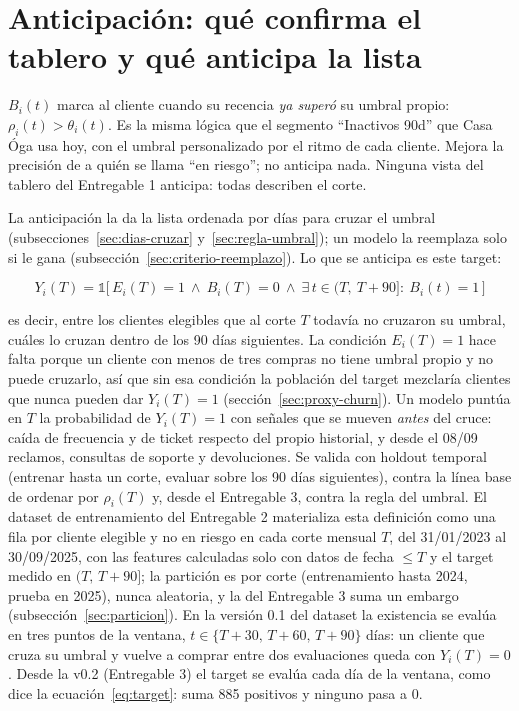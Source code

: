 \documentclass[11pt,a4paper]{article}
\begin{document}
\section{Anticipación: qué confirma el tablero y qué anticipa la lista}
\label{sec:anticipacion}

$B_i(t)$ marca al cliente cuando su recencia \emph{ya superó} su umbral propio: $\rho_i(t) > \theta_i(t)$. Es la misma lógica que el segmento ``Inactivos 90d'' que Casa Óga usa hoy, con el umbral personalizado por el ritmo de cada cliente. Mejora la precisión de a quién se llama ``en riesgo''; no anticipa nada. Ninguna vista del tablero del Entregable 1 anticipa: todas describen el corte.

La anticipación la da la lista ordenada por días para cruzar el umbral (subsecciones~\ref{sec:dias-cruzar} y~\ref{sec:regla-umbral}); un modelo la reemplaza solo si le gana (subsección~\ref{sec:criterio-reemplazo}). Lo que se anticipa es este target:

\begin{equation}
Y_i(T) = \mathbb{1}\bigl[\,E_i(T)=1 \ \wedge\ B_i(T)=0 \ \wedge\ \exists\, t \in (T,\ T+90]:\ B_i(t)=1\,\bigr]
\label{eq:target}
\end{equation}

es decir, entre los clientes elegibles que al corte $T$ todavía no cruzaron su umbral, cuáles lo cruzan dentro de los 90 días siguientes. La condición $E_i(T)=1$ hace falta porque un cliente con menos de tres compras no tiene umbral propio y no puede cruzarlo, así que sin esa condición la población del target mezclaría clientes que nunca pueden dar $Y_i(T)=1$ (sección~\ref{sec:proxy-churn}). Un modelo puntúa en $T$ la probabilidad de $Y_i(T)=1$ con señales que se mueven \emph{antes} del cruce: caída de frecuencia y de ticket respecto del propio historial, y desde el 08/09 reclamos, consultas de soporte y devoluciones. Se valida con holdout temporal (entrenar hasta un corte, evaluar sobre los 90 días siguientes), contra la línea base de ordenar por $\rho_i(T)$ y, desde el Entregable 3, contra la regla del umbral. El dataset de entrenamiento del Entregable 2 materializa esta definición como una fila por cliente elegible y no en riesgo en cada corte mensual $T$, del 31/01/2023 al 30/09/2025, con las features calculadas solo con datos de fecha $\le T$ y el target medido en $(T,\,T+90]$; la partición es por corte (entrenamiento hasta 2024, prueba en 2025), nunca aleatoria, y la del Entregable 3 suma un embargo (subsección~\ref{sec:particion}). En la versión 0.1 del dataset la existencia se evalúa en tres puntos de la ventana, $t \in \{T+30,\,T+60,\,T+90\}$ días: un cliente que cruza su umbral y vuelve a comprar entre dos evaluaciones queda con $Y_i(T)=0$. Desde la v0.2 (Entregable 3) el target se evalúa cada día de la ventana, como dice la ecuación~\eqref{eq:target}: suma 885 positivos y ninguno pasa a 0.
\end{document}
